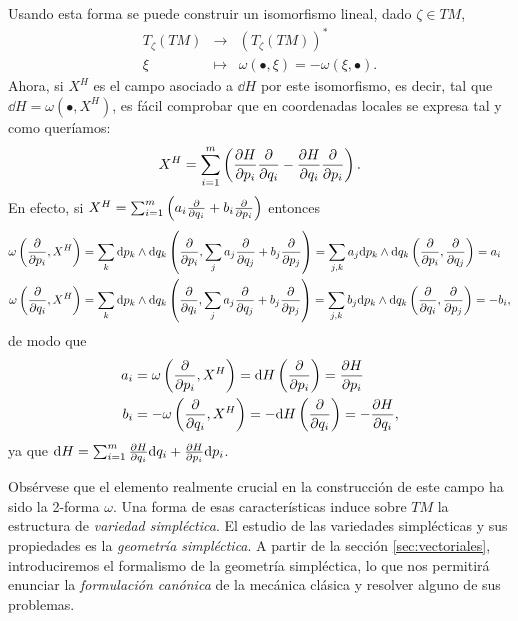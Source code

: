 Usando esta forma se puede construir un isomorfismo lineal, dado $\zeta \in TM$,
\begin{equation}
  \label{isomorfismo}
  \begin{array}{rcl}
     T_{\zeta}(TM) & \longrightarrow & (T_{\zeta}(TM))^* \\
    \xi & \longmapsto & \omega(\bullet,\xi)=-\omega(\xi, \bullet).
  \end{array}
\end{equation}
Ahora, si $X^H$ es el campo asociado a $\dd H$ por este isomorfismo, es decir, tal que $\dd H=\omega(\bullet,X^H)$, es fácil comprobar que en coordenadas locales se expresa tal y como queríamos:
\begin{equation*}
  X^H = \sum_{i=1}^m \left( \frac{\partial H}{\partial p_i} \frac{\partial}{\partial q_i} - \frac{\partial H}{\partial q_i} \frac{\partial}{\partial p_i} \right).
\end{equation*}
En efecto, si $X^H=\sum_{i=1}^m \left( a_i \frac{\partial}{\partial q_i} + b_i \frac{\partial}{\partial p_i} \right)$ entonces
\begin{align*}
  \omega\left(\frac{\partial}{\partial p_i},X^H\right)&=\sum_k\mathrm{d} p_k\wedge \mathrm{d} q_k\left( \frac{\partial}{\partial p_i},\sum_j a_j\frac{\partial}{\partial q_j}+b_j\frac{\partial}{\partial p_j} \right)=\sum_{j,k} a_j \mathrm{d} p_k \wedge \mathrm{d} q_k \left( \frac{\partial}{\partial p_i},\frac{\partial}{\partial q_j} \right)=a_i\\
  \omega\left(\frac{\partial}{\partial q_i},X^H\right)&=\sum_k\mathrm{d} p_k\wedge \mathrm{d} q_k\left( \frac{\partial}{\partial q_i},\sum_j a_j\frac{\partial}{\partial q_j}+b_j\frac{\partial}{\partial p_j} \right)=\sum_{j,k} b_j \mathrm{d} p_k \wedge \mathrm{d} q_k \left( \frac{\partial}{\partial q_i},\frac{\partial}{\partial p_j} \right)=-b_i,
\end{align*}
de modo que
\begin{align*}
  a_i&=\omega\left(\frac{\partial}{\partial p_i},X^H\right)=\mathrm{d} H\left( \frac{\partial}{\partial p_i} \right)=\frac{\partial H}{\partial p_i} \\
  b_i&=-\omega\left(\frac{\partial}{\partial q_i},X^H\right)=-\mathrm{d} H\left( \frac{\partial}{\partial q_i} \right)=-\frac{\partial H}{\partial q_i},
\end{align*}
ya que $\mathrm{d} H = \sum_{i=1}^m\frac{\partial H}{\partial q_i}\mathrm{d} q_i + \frac{\partial H}{\partial p_i}\mathrm{d} p_i$.

Obsérvese que el elemento realmente crucial en la construcción de este campo ha sido la 2-forma $\omega$. Una forma de esas características induce sobre $TM$ la estructura de \emph{variedad simpléctica}. El estudio de las variedades simplécticas y sus propiedades es la \emph{geometría simpléctica}. A partir de la sección \ref{sec:vectoriales}, introduciremos el formalismo de la geometría simpléctica, lo que nos permitirá enunciar la \emph{formulación canónica} de la mecánica clásica y resolver alguno de sus problemas.


